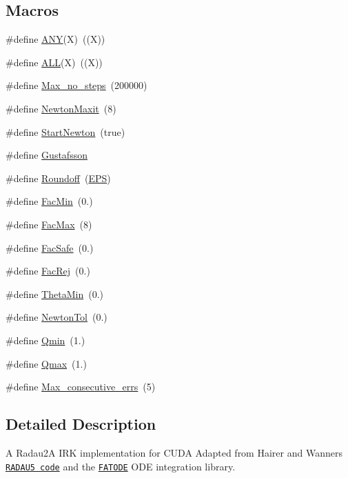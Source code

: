 \subsection*{Macros}
\begin{DoxyCompactItemize}
\item 
\#define \hyperlink{radau2a_8cu_a1fb079c51babe820cd76885d3c519446}{A\+NY}(X)~((X))
\item 
\#define \hyperlink{radau2a_8cu_ada568356af1dada57942e4b6e5d271b0}{A\+LL}(X)~((X))
\item 
\#define \hyperlink{radau2a_8cu_a4f5652e996f678da1b1b93c8aa4a7961}{Max\+\_\+no\+\_\+steps}~(200000)
\item 
\#define \hyperlink{radau2a_8cu_ab408861ee5149b85ac129cb8a3875743}{Newton\+Maxit}~(8)
\item 
\#define \hyperlink{radau2a_8cu_aa9c48bc3c2002ed4e6792dd7f526d783}{Start\+Newton}~(true)
\item 
\#define \hyperlink{radau2a_8cu_a619cdc11d911799dd674458eb84dc349}{Gustafsson}
\item 
\#define \hyperlink{radau2a_8cu_a0628e9521e9961c49b173765f9d815d3}{Roundoff}~(\hyperlink{solver__options_8h_a6ebf6899d6c1c8b7b9d09be872c05aae}{E\+PS})
\item 
\#define \hyperlink{radau2a_8cu_a2709085ffea146cba50846d860f7d945}{Fac\+Min}~(0.)
\item 
\#define \hyperlink{radau2a_8cu_a3ae724566d10e7ae2a48e1d340d6937b}{Fac\+Max}~(8)
\item 
\#define \hyperlink{radau2a_8cu_a29559e0d6fcf09d76688dbc471b01219}{Fac\+Safe}~(0.)
\item 
\#define \hyperlink{radau2a_8cu_afb5b5659c29086c78a546a078c08238f}{Fac\+Rej}~(0.)
\item 
\#define \hyperlink{radau2a_8cu_a1dea03e748069283de9d62ca81b64e75}{Theta\+Min}~(0.)
\item 
\#define \hyperlink{radau2a_8cu_a5ea658585341bf26e79bbf1ed3497e6f}{Newton\+Tol}~(0.)
\item 
\#define \hyperlink{radau2a_8cu_ac523cd36edc6fc54a93dfdb10a772bc0}{Qmin}~(1.)
\item 
\#define \hyperlink{radau2a_8cu_afcfd11ffcebe8a32d20dcacebefa7e6f}{Qmax}~(1.)
\item 
\#define \hyperlink{radau2a_8cu_a172b5bc0830959ab49ca7cb9f0ae44bf}{Max\+\_\+consecutive\+\_\+errs}~(5)
\end{DoxyCompactItemize}


\subsection{Detailed Description}
A Radau2A I\+RK implementation for C\+U\+DA Adapted from Hairer and Wanner\textquotesingle{}s \href{http://www.unige.ch/~hairer/prog/stiff/radau5.f}{\tt R\+A\+D\+A\+U5 code} and the \href{http://people.cs.vt.edu/~asandu/Software/FATODE/index.html}{\tt F\+A\+T\+O\+DE} O\+DE integration library. 

